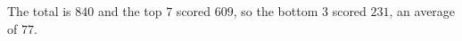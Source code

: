 The total is $840$ and the top $7$ scored $609$, so the bottom $3$ scored $231$, an average of $\boxed{77}$.
